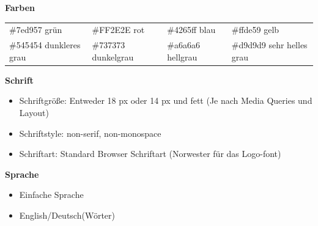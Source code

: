 \documentclass[11pt]{article}
\begin{document}
\textbf{Farben}

\begin{tabular}{llll}
\#7ed957    grün & \#FF2E2E    rot & \#4265ff    blau & \#ffde59    gelb \\
\#545454    dunkleres grau & \#737373    dunkelgrau & \#a6a6a6    hellgrau & \#d9d9d9    sehr helles grau\\
\end{tabular}
\pagebreak

\begin{large}\textbf{Schrift}\end{large}
\begin{itemize}
\item Schriftgröße: Entweder 18 px oder 14 px und fett (Je nach Media Queries und Layout)
\item Schriftstyle: non-serif, non-monospace
\item Schriftart: Standard Browser Schriftart (Norwester für das Logo-font)\\
\end{itemize}

\textbf{Sprache}
\begin{itemize}
\item Einfache Sprache
\item English/Deutsch(Wörter)\\
\end{itemize}

\pagebreak
\printbibliography
\end{document}
